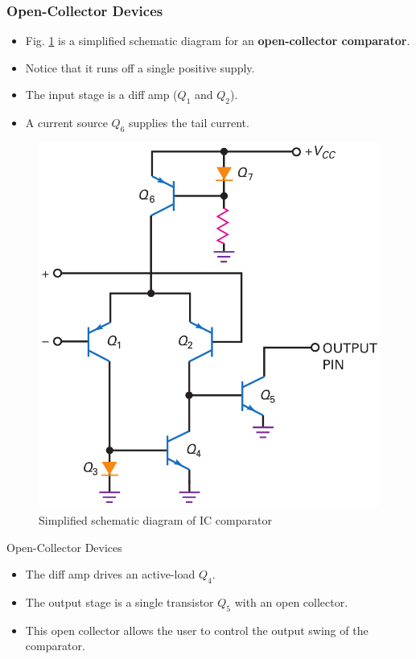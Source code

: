 \documentclass[pdflatex,compress]{beamer}
\begin{document}
\begin{frame}
	\frametitle{Open-Collector Devices}
	\begin{multicols}{2}
		\begin{itemize}
			\item Fig. \ref{fig:2013a} is a simplified schematic diagram for an \textbf{open-collector comparator}.
			\item Notice that it runs off a single positive supply.
			\item The input stage is a diff amp ($Q_1$ and $Q_2$).
			\item A current source $Q_6$ supplies the tail current.
		\end{itemize}
		\vfill\null
		\begin{figure}
			\centering
			\includegraphics[width=\linewidth]{img/2013a}
			\caption{Simpliﬁed schematic diagram of IC comparator}
			\label{fig:2013a}
		\end{figure}
	\end{multicols}
\end{frame}

\begin{frame}{Open-Collector Devices}
	\begin{itemize}
		\item The diff amp drives an active-load $Q_4$.
		\item The output stage is a single transistor $Q_5$ with an open collector.
		\item This open collector allows the user to control the output swing of the comparator.
	\end{itemize}
\end{frame}
\end{document}
